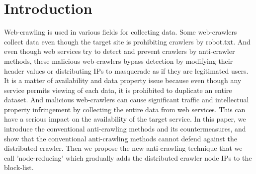 \documentclass[sigconf,anonymous=true]{acmart}
\begin{document}
\maketitle


%
%
\section{Introduction}
Web-crawling is used in various fields for collecting data. Some web-crawlers collect data even though the target site is prohibiting crawlers by robot.txt. And even though web services try to detect and prevent crawlers by anti-crawler methods, these malicious web-crawlers bypass detection by modifying their header values or distributing IPs to masquerade as if they are legitimated users.
It is a matter of availability and data property issue because even though any service permits viewing of each data, it is prohibited to duplicate an entire dataset. And malicious web-crawlers can cause significant traffic and intellectual property infringement by collecting the entire data from web services. This can have a serious impact on the availability of the target service.
In this paper, we introduce the conventional anti-crawling methods and its countermeasures, and show that the conventional anti-crawling methods cannot defend against the distributed crawler. Then we propose the new anti-crawling technique that we call 'node-reducing' which gradually adds the distributed crawler node IPs to the block-list.

%
%
\end{document}
